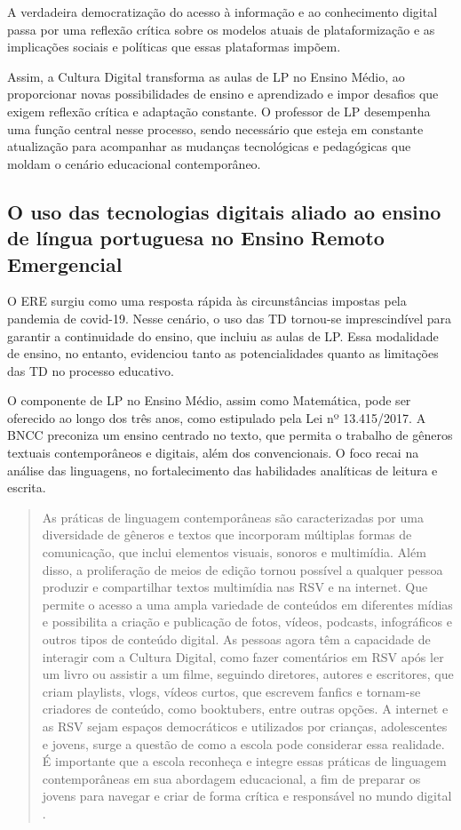 \documentclass[portuguese]{textolivre}
\begin{document}
A verdadeira democratização do acesso à informação e ao conhecimento digital passa por uma reflexão crítica sobre os modelos atuais de plataformização e as implicações sociais e políticas que essas plataformas impõem.

Assim, a Cultura Digital transforma as aulas de LP no Ensino Médio, ao proporcionar novas possibilidades de ensino e aprendizado e impor desafios que exigem reflexão crítica e adaptação constante. O professor de LP desempenha uma função central nesse processo, sendo necessário que esteja em constante atualização para acompanhar as mudanças tecnológicas e pedagógicas que moldam o cenário educacional contemporâneo.


\subsection{O uso das tecnologias digitais aliado ao ensino de língua portuguesa no Ensino Remoto Emergencial}\label{sec-fmt-manuscrito}
O ERE surgiu como uma resposta rápida às circunstâncias impostas pela pandemia de covid-19. Nesse cenário, o uso das TD tornou-se imprescindível para garantir a continuidade do ensino, que incluiu as aulas de LP. Essa modalidade de ensino, no entanto, evidenciou tanto as potencialidades quanto as limitações das TD no processo educativo.

O componente de LP no Ensino Médio, assim como Matemática, pode ser oferecido ao longo dos três anos, como estipulado pela Lei nº 13.415/2017. A BNCC preconiza um ensino centrado no texto, que permita o trabalho de gêneros textuais contemporâneos e digitais, além dos convencionais. O foco recai na análise das linguagens, no fortalecimento das habilidades analíticas de leitura e escrita.

\begin{quote}
    As práticas de linguagem contemporâneas são caracterizadas por uma diversidade de gêneros e textos que incorporam múltiplas formas de comunicação, que inclui elementos visuais, sonoros e multimídia. Além disso, a proliferação de meios de edição tornou possível a qualquer pessoa produzir e compartilhar textos multimídia nas RSV e na internet. Que permite o acesso a uma ampla variedade de conteúdos em diferentes mídias e possibilita a criação e publicação de fotos, vídeos, podcasts, infográficos e outros tipos de conteúdo digital. As pessoas agora têm a capacidade de interagir com a Cultura Digital, como fazer comentários em RSV após ler um livro ou assistir a um filme, seguindo diretores, autores e escritores, que criam playlists, vlogs, vídeos curtos, que escrevem fanfics e tornam-se criadores de conteúdo, como booktubers, entre outras opções. A internet e as RSV sejam espaços democráticos e utilizados por crianças, adolescentes e jovens, surge a questão de como a escola pode considerar essa realidade. É importante que a escola reconheça e integre essas práticas de linguagem contemporâneas em sua abordagem educacional, a fim de preparar os jovens para navegar e criar de forma crítica e responsável no mundo digital \cite[p. 70]{brasil2018}.
\end{quote}
\end{document}
